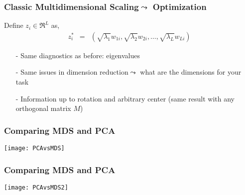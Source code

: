 \begin{frame}[fragile]
\frametitle{Classic Multidimensional Scaling$\leadsto$ Optimization}

Define ${z}_{i}  \in \Re^{L}$ as, 
\begin{eqnarray}
{z}_{i}^{*} & = & \left(\sqrt{\lambda_{1}}w_{1i},\sqrt{\lambda_{2}}w_{2i}, \hdots, \sqrt{\lambda_{L}} w_{Li} \right) \nonumber 
\end{eqnarray}

 

\begin{itemize}
\item[-] Same diagnostics as before: eigenvalues
\item[-] Same issues in dimension reduction$\leadsto$ what are the dimensions for your task
\item[-] Information up to \alert{rotation} and arbitrary \alert{center} (same result with any \alert{orthogonal} matrix ${M}$)
\end{itemize}


\end{frame}



\begin{frame}[fragile]
\frametitle{Comparing MDS and PCA}
\texttt{[image: PCAvsMDS]}
\end{frame}

\begin{frame}[fragile]
\frametitle{Comparing MDS and PCA}
\texttt{[image: PCAvsMDS2]}
\end{frame}

